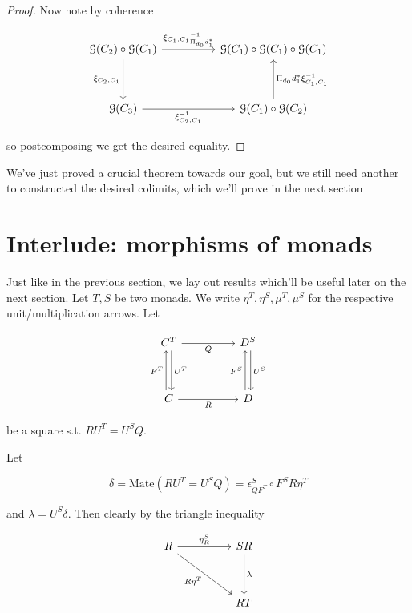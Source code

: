 \documentclass[10pt, oneside]{article}
\begin{document}
\begin{proof}
Now note by coherence

\[\begin{tikzcd}[ampersand replacement=\&]
	{\mathcal{G}(C_2) \circ \mathcal{G}(C_1)} \&\& {\mathcal{G} (C_1) \circ \mathcal{G} (C_1) \circ \mathcal{G} (C_1)} \\
	\\
	{\mathcal{G}(C_3)} \&\& {\mathcal{G}(C_1) \circ \mathcal{G}(C_2)}
	\arrow["{\xi_{C_2, C_1}}"', from=1-1, to=3-1]
	\arrow["{{\xi_{C_1, C_1}}_{\Pi_{d_0} d_1^\ast}^{-1}}", from=1-1, to=1-3]
	\arrow["{\Pi_{d_0} d_1^\ast \xi_{C_1, C_1}^{-1}}"', from=3-3, to=1-3]
	\arrow["{\xi_{C_2, C_1}^{-1}}"', from=3-1, to=3-3]
\end{tikzcd}\]

\noindent so postcomposing we get the desired equality.
\end{proof}


We've just proved a crucial theorem towards our goal, but we still need another to constructed the desired colimits, which we'll prove in the next section

\section{Interlude: morphisms of monads}

Just like in the previous section, we lay out results which'll be useful later on the next section. Let $T, S$ be two monads. We write $\eta^T, \eta^S, \mu^T, \mu^S$ for the respective unit/multiplication arrows. Let

\[\begin{tikzcd}[ampersand replacement=\&]
	{C^T} \&\& {D^S} \\
	\\
	C \&\& D
	\arrow["Q"', from=1-1, to=1-3]
	\arrow["R"', from=3-1, to=3-3]
	\arrow["{U^T}", shift left, from=1-1, to=3-1]
	\arrow["{U^S}", shift left, from=1-3, to=3-3]
	\arrow["{F^T}", shift left, from=3-1, to=1-1]
	\arrow["{F^S}", shift left, from=3-3, to=1-3]
\end{tikzcd}\]

\noindent be a square s.t. $R U^T = U^S Q$.

Let

$$\delta = \mathrm{Mate}(R U^T = U^S Q) = \epsilon^S_{Q F^T} \circ F^S R \eta^T$$

\noindent and $\lambda = U^S \delta$. Then clearly by the triangle inequality

\[\begin{tikzcd}[ampersand replacement=\&]
	R \&\& SR \\
	\\
	\&\& RT
	\arrow["{R \eta^T}"', from=1-1, to=3-3]
	\arrow["\lambda", from=1-3, to=3-3]
	\arrow["{\eta^S_R}", from=1-1, to=1-3]
\end{tikzcd}\]
\end{document}
